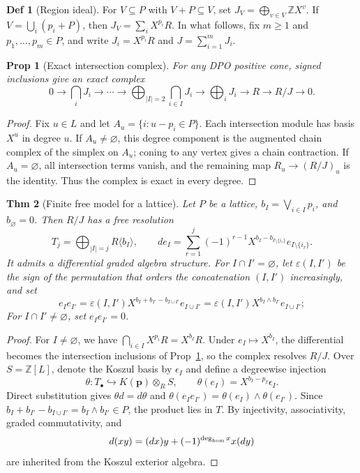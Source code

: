 \documentclass[10pt,letterpaper]{amsart}
\numberwithin{equation}{section}
\newtheorem{thm}{Thm}[section]
\newtheorem{prop}[thm]{Prop}
\theoremstyle{definition}
\newtheorem{defn}{Def}[section]
\newcommand{\Z}{\mathbb Z}
\newcommand{\sh}[1]{\langle #1\rangle}
\newcommand{\eps}{\varepsilon}
\begin{document}
\begin{defn}[Region ideal]\label{def:monomial}
For $V\subseteq P$ with $V+P\subseteq V$, set $J_V=\bigoplus_{v\in V}\Z X^v$.
If $V=\bigcup_i(p_i+P)$, then $J_V=\sum_i X^{p_i}R$. In what follows, fix $m\ge1$ and $p_1,\ldots,p_m\in P$, and write $J_i=X^{p_i}R$ and $J=\sum_{i=1}^mJ_i$.
\end{defn}

\begin{prop}[Exact intersection complex]\label{prop:intersection-resolution}
For any DPO positive cone, signed inclusions give an exact complex
\[
0\longrightarrow\bigcap_iJ_i\longrightarrow\cdots\longrightarrow
\bigoplus_{|I|=2}\bigcap_{i\in I}J_i\longrightarrow
\bigoplus_iJ_i\longrightarrow R\longrightarrow R/J\longrightarrow0.
\]
\end{prop}
\begin{proof}
Fix $u\in L$ and let $A_u=\{i:u-p_i\in P\}$. Each intersection module has basis $X^u$ in degree $u$. If $A_u\ne\varnothing$, this degree component is the augmented chain complex of the simplex on $A_u$; coning to any vertex gives a chain contraction.
If $A_u=\varnothing$, all intersection terms vanish, and the remaining map $R_u\to(R/J)_u$ is the identity. Thus the complex is exact in every degree.
\end{proof}

\begin{thm}[Finite free model for a lattice]\label{thm:taylor}
Let $P$ be a lattice, $b_I=\bigvee_{i\in I}p_i$, and $b_\varnothing=0$. Then $R/J$ has a free resolution
\[
T_j=\bigoplus_{|I|=j}R\sh{b_I},\qquad
de_I=\sum_{r=1}^{j}(-1)^{r-1}X^{b_I-b_{I\setminus\{i_r\}}}e_{I\setminus\{i_r\}}.
\]
It admits a differential graded algebra structure. For $I\cap I'=\varnothing$, let $\eps(I,I')$ be the sign of the permutation that orders the concatenation $(I,I')$ increasingly, and set
\[
e_Ie_{I'}=\eps(I,I')X^{b_I+b_{I'}-b_{I\cup I'}}e_{I\cup I'}
=\eps(I,I')X^{b_I\wedge b_{I'}}e_{I\cup I'};
\]
For $I\cap I'\ne\varnothing$, set $e_Ie_{I'}=0$.
\end{thm}
\begin{proof}
For $I\ne\varnothing$, we have $\bigcap_{i\in I}X^{p_i}R=X^{b_I}R$. Under $e_I\mapsto X^{b_I}$, the differential becomes the intersection inclusions of Prop~\ref{prop:intersection-resolution}, so the complex resolves $R/J$.
Over $S=\Z[L]$, denote the Koszul basis by $\epsilon_I$ and define a degreewise injection
\[
\theta:T_\bullet\hookrightarrow K(\mathbf p)\otimes_RS,
\qquad\theta(e_I)=X^{b_I-p_I}\epsilon_I.
\]
Direct substitution gives $\theta d=d\theta$ and $\theta(e_Ie_{I'})=\theta(e_I)\wedge\theta(e_{I'})$.
Since $b_I+b_{I'}-b_{I\cup I'}=b_I\wedge b_{I'}\in P$, the product lies in $T$. By injectivity, associativity, graded commutativity, and
\[
d(xy)=(dx)y+(-1)^{\deg_{\rm hom}x}x(dy)
\]
are inherited from the Koszul exterior algebra.
\end{proof}
\end{document}
